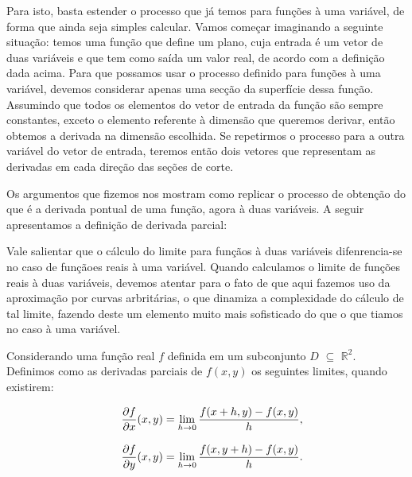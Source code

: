 Para isto, basta estender o processo que já temos para funções à uma variável,
de forma que ainda seja simples calcular. Vamos começar imaginando a seguinte
situação: temos uma função que define um plano, cuja entrada é um vetor de
duas variáveis e que tem como saída um valor real, de acordo com a definição
dada acima. Para que possamos usar o processo definido para funções à uma
variável, devemos considerar apenas uma secção da superfície dessa função.
Assumindo que todos os elementos do vetor de entrada da função são sempre
constantes, exceto o elemento referente à dimensão que queremos derivar, então
obtemos a derivada na dimensão escolhida. Se repetirmos o processo para a outra
variável do vetor de entrada, teremos então dois vetores que representam as
derivadas em cada direção das seções de corte.

Os argumentos que fizemos nos mostram como replicar o processo de obtenção do
que é a derivada pontual de uma função, agora à duas variáveis. A seguir
apresentamos a definição de derivada parcial:

\begin{definition}

    Vale salientar que o cálculo do limite para funçãos à duas variáveis
    difenrencia-se no caso de funçãoes reais à uma variável. Quando calculamos
    o limite de funções reais à duas variáveis, devemos atentar para o fato
    de que aqui fazemos uso da aproximação por curvas arbritárias, o que
    dinamiza a complexidade do cálculo de tal limite, fazendo deste um elemento
    muito mais sofisticado do que o que tiamos no caso à uma variável.

    Considerando uma função real $f$ definida em um subconjunto $D$ $\subseteq$ \(\mathbb{R}^2\). Definimos como as derivadas parciais de $f(x, y)$ os seguintes limites, quando existirem:

    \begin{equation}
        \begin{array}{ccc}
            &   \displaystyle {\displaystyle{\frac{\partial f}{\partial x}}(x, y) = \lim\limits_{h \to 0} \frac{f(x+h, y) - f(x, y)}{h},}\\
            &\\
            &   \displaystyle {\displaystyle{\frac{\partial f}{\partial y}}(x, y) = \lim\limits_{h \to 0} \frac{f(x,y+h) - f(x,y)}{h}.}\\
        \end{array}
    \end{equation}

\end{definition}

